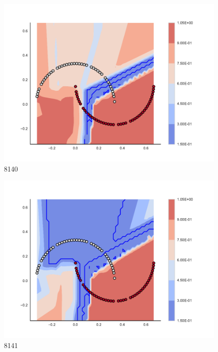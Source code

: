 \begin{subfigure}[b]{0.09\textwidth}
    \includegraphics[clip, trim=2.35cm 1.75cm 4.5cm 0cm,width=\textwidth]{img/convergence/8140.pdf}
    \caption{8140}
    \label{fig:convergence_8140}
\end{subfigure}
%
\begin{subfigure}[b]{0.09\textwidth}
    \includegraphics[clip, trim=2.35cm 1.75cm 4.5cm 0cm,width=\textwidth]{img/convergence/8141.pdf}
    \caption{8141}
    \label{fig:convergence_8141}
\end{subfigure}
%
